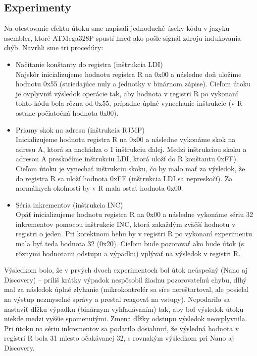 \subsection{Experimenty}
Na otestovanie efektu útoku sme napísali jednoduché úseky kódu v jazyku asembler, ktoré ATMega328P spustí hneď ako pošle signál zdroju indukovania chýb. Navrhli sme tri procedúry:
\begin{itemize}
    \item Načítanie konštanty do registra (inštrukcia LDI)\\
    Najskôr inicializujeme hodnotu registra R na 0x00 a následne doň uložíme hodnotu 0x55 (striedajúce nuly a jednotky v binárnom zápise). Cieľom útoku je ovplyvniť výsledok operácie tak, aby hodnota v registri R po vykonaní tohto kódu bola rôzna od 0x55, prípadne úplné vynechanie inštrukcie (v R ostane počiatočná hodnota 0x00).
    \item Priamy skok na adresu (inštrukcia RJMP)\\
    Inicializujeme hodnotu registra R na 0x00 a následne vykonáme skok na adresu A, ktorá sa nachádza o 1 inštrukciu ďalej. Medzi inštrukciou skoku a adresou A preskočíme inštrukciu LDI, ktorá uloží do R konštantu 0xFF). Cieľom útoku je vynechať inštrukciu skoku, čo by malo mať za výsledok, že do registra R sa uloží hodnota 0xFF (inštrukcia LDI sa nepreskočí). Za normálnych okolností by v R mala ostať hodnota 0x00.
    \item Séria inkrementov (inštrukcia INC)\\
    Opäť inicializujeme hodnotu registra R na 0x00 a následne vykonáme sériu 32 inkrementov pomocou inštrukcie INC, ktorá zakaždým zväčší hodnotu v registri o jeden. Pri korektnom behu by v registri R po vykonaní experimentu mala byť teda hodnota 32 (0x20). Cieľom bude pozorovať ako bude útok (s rôznymi hodnotami odstupu a výpadku) vplývať na výsledok v registri R.
\end{itemize}

Výsledkom bolo, že v prvých dvoch experimentoch bol útok neúspešný (Nano aj Discovery) -- príliš krátky výpadok nespôsobil žiadnu pozorovateľnú chybu, dlhý mal za následok úplné zlyhanie (mikrokontrolér sa síce nereštartoval, ale posielal na výstup nezmyselné správy a prestal reagovať na vstupy). Nepodarilo sa nastaviť dĺžku výpadku (binárnym vyhľadávaním) tak, aby bol výsledok útoku niekde medzi vyššie spomenutými. Zmena dĺžky odstupu výsledok neovplyvnila. Pri útoku na sériu inkrementov sa podarilo dosiahnuť, že výsledná hodnota v registri R bola 31 miesto očakávanej 32, s rovnakým výsledkom pri Nano aj Discovery.


